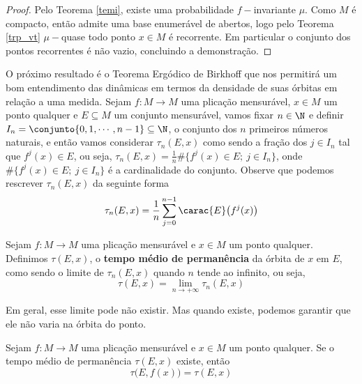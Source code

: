 \begin{proof} Pelo Teorema \ref{temi}, existe uma probabilidade $f-$invariante $\mu$. Como $M$ é compacto, então admite uma base enumerável de abertos, logo pelo Teorema \ref{trp_vt} $\mu-$quase todo ponto $x\in M$ é recorrente. Em particular o conjunto dos pontos recorrentes é não vazio, concluindo a demonstração.
\end{proof}

O próximo resultado é o Teorema Ergódico de Birkhoff que nos permitirá um bom entendimento das dinâmicas em termos da densidade de suas órbitas em relação a uma medida. Sejam $f:M\to M$ uma plicação mensurável, $x\in M$ um ponto qualquer e $E\subseteq M$ um conjunto mensurável, vamos fixar $n\in\N$ e definir $I_n=\conjunto{0,1,\cdots,n-1}\subseteq\N$, o conjunto dos $n$ primeiros números naturais, e então vamos considerar $\tau_n(E,x)$ como sendo a fração dos $j\in I_n$ tal que $f^j(x)\in E$, ou seja, $\tau_n(E,x) = \frac{1}{n}\#\big\{f^j(x)\in E;\ j\in I_n\big\}$, onde $\#\big\{f^j(x)\in E;\ j\in I_n\big\}$ é a cardinalidade do conjunto. Observe que podemos rescrever $\tau_n(E,x)$ da seguinte forma
\begin{equation}\label{L40}
\tau_n(E,x) = \dfrac{1}{n}\sum_{j=0}^{n-1}\carac{E}\big(f^j(x)\big)
\end{equation}

\begin{definicao} Sejam $f:M\to M$ uma plicação mensurável e $x\in M$ um ponto qualquer. Definimos $\tau(E,x)$, o \textbf{tempo médio de permanência} da órbita de $x$ em $E$, como sendo o limite de $\tau_n(E,x)$ quando $n$ tende ao infinito, ou seja,
\begin{equation*}
\tau(E,x)=\lim_{n\to+\infty}\tau_n(E,x)
\end{equation*}
\end{definicao}

Em geral, esse limite pode não existir. Mas quando existe, podemos garantir que ele não varia na órbita do ponto.

\begin{lema}\label{tmpo} Sejam $f:M\to M$ uma plicação mensurável e $x\in M$ um ponto qualquer. Se o tempo médio de permanência $\tau(E,x)$ existe, então $$\tau\big(E,f(x)\big)=\tau(E,x)$$
\end{lema}

